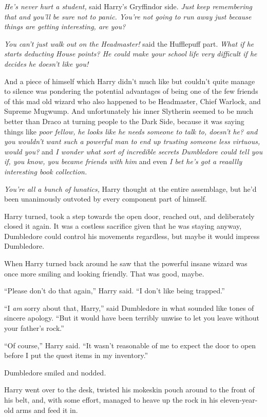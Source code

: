 \emph{He’s never hurt a student,} said Harry’s Gryffindor side. \emph{Just keep remembering that and you’ll be sure not to panic. You’re not going to run away just because things are getting interesting, are you?}

\emph{You can’t just walk out on the Headmaster!} said the Hufflepuff part. \emph{What if he starts deducting House points? He could make your school life very difficult if he decides he doesn’t like you!}

And a piece of himself which Harry didn’t much like but couldn’t quite manage to silence was pondering the potential advantages of being one of the few friends of this mad old wizard who also happened to be Headmaster, Chief Warlock, and Supreme Mugwump. And unfortunately his inner Slytherin seemed to be much better than Draco at turning people to the Dark Side, because it was saying things like \emph{poor fellow, he looks like he needs someone to talk to, doesn’t he? \emph{and} you wouldn’t want such a powerful man to end up trusting someone less virtuous, would you?} and \emph{I wonder what sort of incredible secrets Dumbledore could tell you if, you know, you became friends with him} and even \emph{I bet he’s got a reaallly interesting book collection.}

\emph{You’re all a bunch of lunatics,} Harry thought at the entire assemblage, but he’d been unanimously outvoted by every component part of himself.

Harry turned, took a step towards the open door, reached out, and deliberately closed it again. It was a costless sacrifice given that he was staying anyway, Dumbledore could control his movements regardless, but maybe it would impress Dumbledore.

When Harry turned back around he saw that the powerful insane wizard was once more smiling and looking friendly. That was good, maybe.

“Please don’t do that again,” Harry said.
“I don’t like being trapped.”

“I \emph{am} sorry about that, Harry,” said Dumbledore in what sounded like tones of sincere apology.
“But it would have been terribly unwise to let you leave without your father’s rock.”

“Of course,” Harry said.
“It wasn’t reasonable of me to expect the door to open before I put the quest items in my inventory.”

Dumbledore smiled and nodded.

Harry went over to the desk, twisted his mokeskin pouch around to the front of his belt, and, with some effort, managed to heave up the rock in his eleven-year-old arms and feed it in.

